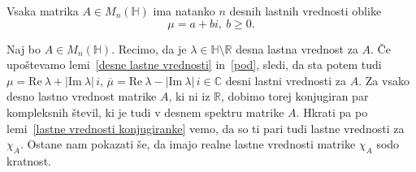 \documentclass[mat1, tisk]{fmfdelo}
\numberwithin{equation}{section}
\begin{document}
\begin{trditev}\label{standardne}
    Vsaka matrika $A \in M_{n}(\mathbb{H})$ ima natanko $n$ desnih lastnih vrednosti oblike
    $$\mu = a + bi, \: b \geq 0.$$
\end{trditev}

\begin{dokaz}
    Naj bo $A \in M_{n}(\mathbb{H})$. Recimo, da je $\lambda \in \mathbb{H} \setminus \mathbb{R}$ desna lastna vrednost za 
    $A$. Če upoštevamo lemi~\ref{desne lastne vrednosti} in~\ref{pod}, sledi, da sta potem tudi $\mu = \mathrm{Re} \: \lambda + |\mathrm{Im} \: \lambda| \, i, \, \overline{\mu} = \mathrm{Re} \: \lambda - |\mathrm{Im} \: \lambda| \, i \in 
    \mathbb{C}$ desni lastni vrednosti za $A$. Za vsako desno lastno vrednost matrike $A$, ki ni iz $\mathbb{R}$, dobimo torej konjugiran par kompleksnih števil, ki
    je tudi v desnem spektru matrike $A$. Hkrati pa po lemi~\ref{lastne vrednosti konjugiranke} vemo, da so ti pari tudi lastne vrednosti
    za $\chi_A$. Ostane nam pokazati še, da imajo realne lastne vrednosti matrike $\chi_A$ sodo kratnost.


\end{dokaz}
\end{document}
